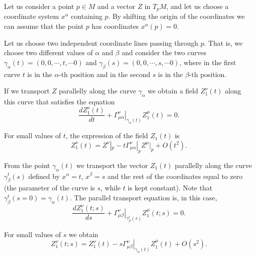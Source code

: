 \begin{points}
\item Let us consider a point $p\in M$ and a vector $Z$ in $T_pM$, and let us choose a coordinate system $x^\alpha$ containing $p$. By shifting the origin of the coordinates we can assume that the point $p$ has coordinates $x^\alpha(p)=0$.

\item Let us choose two independent coordinate lines passing through $p$. That is, we choose two different values of $\alpha$ and $\beta$ and consider the two curves $\gamma_\alpha(t)=(0,0,\cdots,t,\cdots0)$ and $\gamma_\beta(s)=(0,0,\cdots,s,\cdots0)$, where in the first curve $t$ is in the $\alpha$-th position and in the second $s$ is in the $\beta$-th position.

\item If we transport $Z$ parallelly along the curve $\gamma_\alpha$ we obtain a field $Z^\nu_1(t)$ along this curve that satisfies the equation
\[
  \frac{dZ^\nu_1(t)}{dt}+\left.\Gamma^\nu_{\mu\alpha}\right|_{\gamma_\alpha(t)}Z^\mu_1(t)=0 .
\]

\item For small values of $t$, the expression of the field $Z_1(t)$ is
\begin{equation}
  Z^\nu_1(t)=Z^\nu|_p-t\Gamma^\nu_{\mu\alpha}|_pZ^\mu|_p+O(t^2).
\end{equation}

\item From the point $\gamma_\alpha(t)$ we transport the vector $Z_1(t)$ parallelly along the curve $\gamma^t_\beta(s)$ defined by $x^\alpha=t$, $x^\beta=s$ and the rest of the coordinates equal to zero (the parameter of the curve is $s$, while $t$ is kept constant). Note that $\gamma^t_\beta(s=0)=\gamma_\alpha(t)$. The parallel transport equation is, in this case,
\[
  \frac{dZ^\nu_1(t;s)}{ds}+\left.\Gamma^\nu_{\mu\beta}\right|_{\gamma^t_\beta(s)}Z^\mu_1(t;s)=0 .
\]

\item For small values of $s$ we obtain
\[
  Z^\nu_1(t;s)=Z^\nu_1(t)-s\left.\Gamma^\nu_{\mu\beta}\right|_{\gamma_\alpha(t)}Z^\mu_1(t)+O(s^2).
\]


\end{points}
